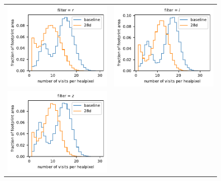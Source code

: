 \documentclass[preprintm,linenumbers]{aastex631}
\begin{document}
\begin{figure}
\begin{tabular}{@{}c@{}c@{}}
				 \includegraphics{results/histograms/hist_first_year_one_snap_v4_0_10yrs_db_noDD_noTwi_CountMetric_doAllTemplateMetrics_reduceCount_r_28_noDD_noTwi.pdf} &
				\includegraphics{results/histograms/hist_first_year_one_snap_v4_0_10yrs_db_noDD_noTwi_CountMetric_doAllTemplateMetrics_reduceCount_i_28_noDD_noTwi.pdf} \\
				 \includegraphics{results/histograms/hist_first_year_one_snap_v4_0_10yrs_db_noDD_noTwi_CountMetric_doAllTemplateMetrics_reduceCount_z_28_noDD_noTwi.pdf} &

\end{tabular}
\end{figure}
\end{document}
